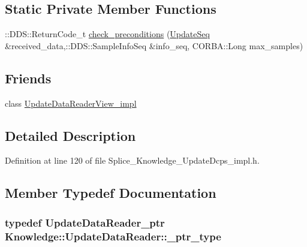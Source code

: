 \subsection*{Static Private Member Functions}
\begin{DoxyCompactItemize}
\item 
::DDS::ReturnCode\_\-t \hyperlink{classKnowledge_1_1UpdateDataReader__impl_a4fa9d3afa1901d7a5817e449bdc8cd1d}{check\_\-preconditions} (\hyperlink{namespaceKnowledge_ab62e46316b954f0d249e0e45de7059dc}{UpdateSeq} \&received\_\-data,::DDS::SampleInfoSeq \&info\_\-seq, CORBA::Long max\_\-samples)
\end{DoxyCompactItemize}
\subsection*{Friends}
\begin{DoxyCompactItemize}
\item 
class \hyperlink{classKnowledge_1_1UpdateDataReader__impl_aecb826c92ef0e1fa142adfb4e8ea90c9}{UpdateDataReaderView\_\-impl}
\end{DoxyCompactItemize}


\subsection{Detailed Description}


Definition at line 120 of file Splice\_\-Knowledge\_\-UpdateDcps\_\-impl.h.



\subsection{Member Typedef Documentation}
\hypertarget{classKnowledge_1_1UpdateDataReader_a5aa1e0d7df2df2db07892433815c0864}{
\subsubsection[{\_\-ptr\_\-type}]{\setlength{\rightskip}{0pt plus 5cm}typedef {\bf UpdateDataReader\_\-ptr} {\bf Knowledge::UpdateDataReader::\_\-ptr\_\-type}}}
\label{d7/d6e/classKnowledge_1_1UpdateDataReader_a5aa1e0d7df2df2db07892433815c0864}


